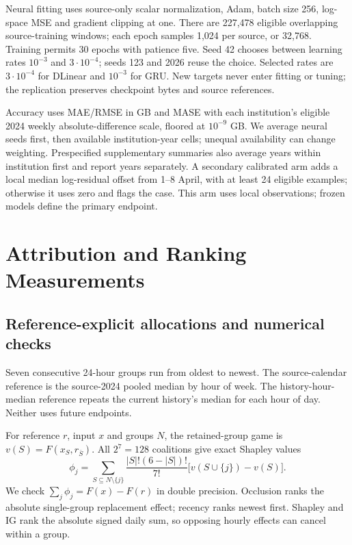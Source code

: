 \documentclass[conference]{IEEEtran}
\begin{document}
Neural fitting uses source-only scalar normalization, Adam, batch size 256, log-space MSE and gradient clipping at one. There are 227,478 eligible overlapping source-training windows; each epoch samples 1,024 per source, or 32,768. Training permits 30 epochs with patience five. Seed 42 chooses between learning rates $10^{-3}$ and $3\cdot10^{-4}$; seeds 123 and 2026 reuse the choice. Selected rates are $3\cdot10^{-4}$ for DLinear and $10^{-3}$ for GRU. New targets never enter fitting or tuning; the replication preserves checkpoint bytes and source references.

Accuracy uses MAE/RMSE in GB and MASE with each institution's eligible 2024 weekly absolute-difference scale, floored at $10^{-9}$ GB. We average neural seeds first, then available institution-year cells; unequal availability can change weighting. Prespecified supplementary summaries also average years within institution first and report years separately. A secondary calibrated arm adds a local median log-residual offset from 1--8 April, with at least 24 eligible examples; otherwise it uses zero and flags the case. This arm uses local observations; frozen models define the primary endpoint.

\section{Attribution and Ranking Measurements}
\subsection{Reference-explicit allocations and numerical checks}
Seven consecutive 24-hour groups run from oldest to newest. The source-calendar reference is the source-2024 pooled median by hour of week. The history-hour-median reference repeats the current history's median for each hour of day. Neither uses future endpoints.

For reference $r$, input $x$ and groups $N$, the retained-group game is $v(S)=F(x_S,r_{\bar S})$. All $2^7=128$ coalitions give exact Shapley values
\begin{equation}
\phi_j=\sum_{S\subseteq N\setminus\{j\}}\frac{|S|!(6-|S|)!}{7!}\big[v(S\cup\{j\})-v(S)\big].
\end{equation}
We check $\sum_j\phi_j=F(x)-F(r)$ in double precision. Occlusion ranks the absolute single-group replacement effect; recency ranks newest first. Shapley and IG rank the absolute signed daily sum, so opposing hourly effects can cancel within a group.
\end{document}
